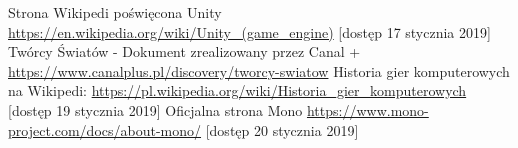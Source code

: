 \documentclass[a4paper,12pt,twoside,openany]{report}
\begin{document}
\begin{thebibliography}{99}
 {Strona Wikipedi poświęcona Unity  \url{https://en.wikipedia.org/wiki/Unity_(game_engine)} [dostęp 17 stycznia 2019]}
 {Twórcy Światów - Dokument zrealizowany przez Canal + \url{https://www.canalplus.pl/discovery/tworcy-swiatow}}
 {Historia gier komputerowych na Wikipedi: \url{https://pl.wikipedia.org/wiki/Historia_gier_komputerowych} [dostęp 19 stycznia 2019]}
 {Oficjalna strona Mono \url{https://www.mono-project.com/docs/about-mono/} [dostęp 20 stycznia 2019]}

\end{thebibliography}

\end{document}

